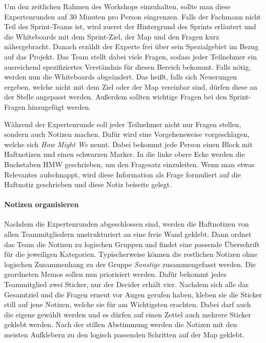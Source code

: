 Um den zeitlichen Rahmen des Workshops einzuhalten, sollte man diese Expertenrunden auf 30 Minuten pro Person eingrenzen. Falls der Fachmann nicht Teil des Sprint-Teams ist, wird zuerst der Hintergrund des Sprints erläutert und die Whiteboards mit dem Sprint-Ziel, der Map und den Fragen kurz nähergebracht. Danach erzählt der Experte frei über sein Spezialgebiet im Bezug auf das Projekt. Das Team stellt dabei viele Fragen, sodass jeder Teilnehmer ein ausreichend spezifiziertes Verständnis für diesen Bereich bekommt. Falls nötig, werden nun die Whiteboards abgeändert. Das heißt, falls sich Neuerungen ergeben, welche nicht mit dem Ziel oder der Map vereinbar sind, dürfen diese an der Stelle angepasst werden. Außerdem sollten wichtige Fragen bei den Sprint-Fragen hinzugefügt werden.

Während der Expertenrunde soll jeder Teilnehmer nicht nur Fragen stellen, sondern auch Notizen machen. Dafür wird eine Vorgehensweise vorgeschlagen, welche sich \textit{How Might We} nennt. Dabei bekommt jede Person einen Block mit Haftnotizen und einen schwarzen Marker. In die linke obere Ecke werden die Buchstaben HMW geschrieben, um den Fragesatz einzuleiten. Wenn man etwas Relevantes aufschnappt, wird diese Information als Frage formuliert auf die Haftnotiz geschrieben und diese Notiz beiseite gelegt.

\paragraph{Notizen organisieren}
Nachdem die Expertenrunden abgeschlossen sind, werden die Haftnotizen von allen Teammitgliedern unstrukturiert an eine freie Wand geklebt. Dann ordnet das Team die Notizen zu logischen Gruppen und findet eine passende Überschrift für die jeweiligen Kategorien. Typischerweise können die restlichen Notizen ohne logischen Zusammenhang zu der Gruppe \textit{Sonstige} zusammengefasst werden.
Die geordneten Memos sollen nun priorisiert werden. Dafür bekommt jedes Teammitglied zwei Sticker, nur der Decider erhält vier. Nachdem sich alle das Gesamtziel und die Fragen erneut vor Augen gerufen haben, kleben sie die Sticker still auf jene Notizen, welche sie für am Wichtigsten erachten. Dabei darf auch die eigene gewählt werden und es dürfen auf einen Zettel auch mehrere Sticker geklebt werden. Nach der stillen Abstimmung werden die Notizen mit den meisten Aufklebern zu den logisch passenden Schritten auf der Map geklebt.

